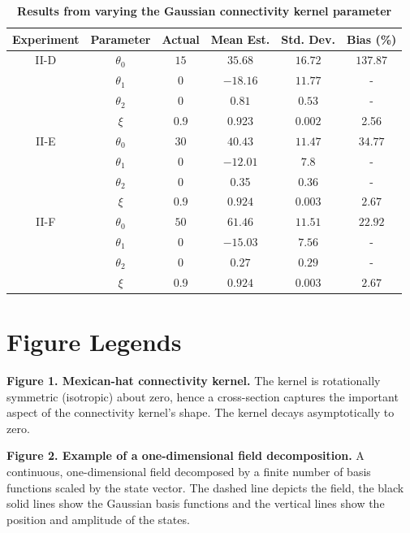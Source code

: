 \documentclass[review,authoryear,3p]{elsarticle}
\begin{document}
\clearpage
\newpage
\begin{table}[!ht]
\begin{tabular}{c|ccccc}
	Experiment & Parameter & Actual & Mean Est. & Std. Dev. & Bias (\%) \\ \hline
	II-D &$\theta_0$ & $15$ & $35.68$ & $16.72$ & $137.87$ \\
	& $\theta_1$ & 0 & $-18.16$ & $11.77$ & - \\
	& $\theta_2$ & 0 & $0.81$ & $0.53$ & - \\
	& $\xi$ & 0.9 & 0.923 & $0.002$ & 2.56 \\ \hline	
	
 	II-E& $\theta_0$ & $30$ & $40.43$ & $11.47$ & $34.77$ \\
	& $\theta_1$ & 0 & $-12.01$ & $7.8$ & - \\
	& $\theta_2$ & 0 & 0.35 & $0.36$ & - \\
	& $\xi$ & 0.9 & $0.924$ & $0.003$ & $2.67$ \\ \hline
	
	II-F & $\theta_0$ & $50$ & $61.46$ & $11.51$ & $22.92$ \\
	& $\theta_1$ & 0 & $-15.03$ & $7.56$ & - \\
	& $\theta_2$ & 0 & $0.27$ & $0.29$ & - \\
	& $\xi$ & 0.9 & $0.924$ & $0.003$ & $2.67$ \\ \hline
\end{tabular}\label{tab:GaussianKernelResults}
\caption{\textbf{Results from varying the Gaussian connectivity kernel parameter}}
\end{table}

\doublespacing

\newpage
\clearpage
\section*{Figure Legends}
{\bf Figure 1. Mexican-hat connectivity kernel.} The kernel is rotationally symmetric (isotropic) about zero, hence a cross-section captures the important aspect of the connectivity kernel's shape. The kernel decays asymptotically to zero.

{\bf Figure 2. Example of a one-dimensional field decomposition.} A continuous, one-dimensional field decomposed by a finite number of basis functions scaled by the state vector. The dashed line depicts the field, the black solid lines show the Gaussian basis functions and the vertical lines show the position and amplitude of the states.
\end{document}
